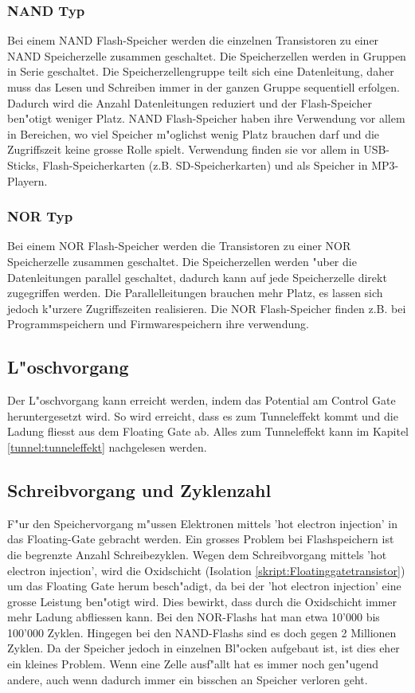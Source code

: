 \begin{refsection}
\subsubsection{NAND Typ}
Bei einem NAND Flash-Speicher werden die einzelnen Transistoren zu einer
NAND Speicherzelle zusammen geschaltet.
Die Speicherzellen werden in Gruppen in Serie geschaltet.
Die Speicherzellengruppe teilt sich eine Datenleitung, daher muss das
Lesen und Schreiben immer in der ganzen Gruppe sequentiell erfolgen.
Dadurch wird die Anzahl Datenleitungen reduziert und der Flash-Speicher
ben"otigt weniger Platz.
NAND Flash-Speicher haben ihre Verwendung vor allem in Bereichen, wo viel
Speicher m"oglichst wenig Platz brauchen darf und die Zugriffszeit keine
grosse Rolle spielt.
Verwendung finden sie vor allem in USB-Sticks, Flash-Speicherkarten
(z.B. SD-Speicherkarten) und als Speicher in MP3-Playern.

\subsubsection{NOR Typ}
Bei einem NOR Flash-Speicher werden die Transistoren zu einer NOR
Speicherzelle zusammen geschaltet.
Die Speicherzellen werden "uber die Datenleitungen parallel geschaltet,
dadurch kann auf jede Speicherzelle direkt zugegriffen werden.
Die Parallelleitungen brauchen mehr Platz, es lassen sich jedoch k"urzere
Zugriffszeiten realisieren.
Die NOR Flash-Speicher finden z.B. bei Programmspeichern und Firmwarespeichern
ihre verwendung.

\subsection{L"oschvorgang}
Der L"oschvorgang kann erreicht werden, indem das Potential am 
Control Gate heruntergesetzt wird.
So wird erreicht, dass es zum Tunneleffekt kommt und die Ladung fliesst
aus dem Floating Gate ab.
Alles zum Tunneleffekt kann im Kapitel \ref{tunnel:tunneleffekt} nachgelesen werden.

\subsection{Schreibvorgang und Zyklenzahl}
F"ur den Speichervorgang m"ussen Elektronen mittels 'hot electron injection'
in das Floating-Gate gebracht werden. Ein grosses Problem bei
Flashspeichern ist die begrenzte Anzahl Schreibezyklen.
Wegen dem Schreibvorgang mittels 'hot electron injection', wird die
Oxidschicht (Isolation \ref{skript:Floatinggatetransistor}) um das Floating Gate herum
besch"adigt, da bei der 'hot electron injection' eine grosse Leistung
ben"otigt wird.
Dies bewirkt, dass durch die Oxidschicht immer mehr Ladung abfliessen kann.
Bei den NOR-Flashs hat man etwa 10'000 bis 100'000 Zyklen.
Hingegen bei den NAND-Flashs sind es doch gegen 2 Millionen Zyklen.
Da der Speicher jedoch in einzelnen Bl"ocken aufgebaut ist, ist dies
eher ein kleines Problem.
Wenn eine Zelle ausf"allt hat es immer noch gen"ugend andere, auch wenn
dadurch immer ein bisschen an Speicher verloren geht.


\end{refsection}
